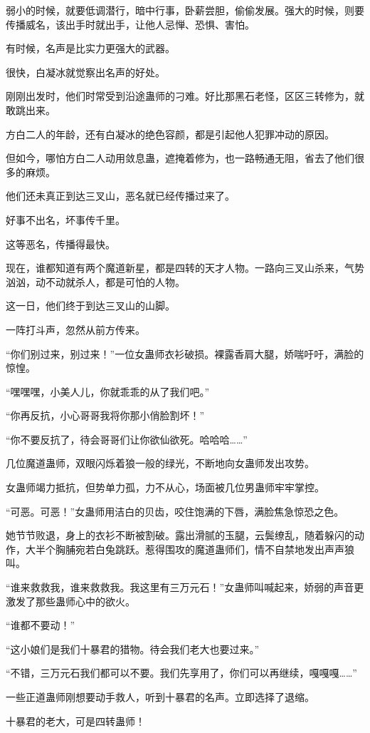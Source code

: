 \begin{this_body}
弱小的时候，就要低调潜行，暗中行事，卧薪尝胆，偷偷发展。强大的时候，则要传播威名，该出手时就出手，让他人忌惮、恐惧、害怕。

有时候，名声是比实力更强大的武器。

很快，白凝冰就觉察出名声的好处。

刚刚出发时，他们时常受到沿途蛊师的刁难。好比那黑石老怪，区区三转修为，就敢跳出来。

方白二人的年龄，还有白凝冰的绝色容颜，都是引起他人犯罪冲动的原因。

但如今，哪怕方白二人动用敛息蛊，遮掩着修为，也一路畅通无阻，省去了他们很多的麻烦。

他们还未真正到达三叉山，恶名就已经传播过来了。

好事不出名，坏事传千里。

这等恶名，传播得最快。

现在，谁都知道有两个魔道新星，都是四转的天才人物。一路向三叉山杀来，气势汹汹，动不动就杀人，都是可怕的人物。

这一日，他们终于到达三叉山的山脚。

一阵打斗声，忽然从前方传来。

“你们别过来，别过来！”一位女蛊师衣衫破损。裸露香肩大腿，娇喘吁吁，满脸的惊惶。

“嘿嘿嘿，小美人儿，你就乖乖的从了我们吧。”

“你再反抗，小心哥哥我将你那小俏脸割坏！”

“你不要反抗了，待会哥哥们让你欲仙欲死。哈哈哈……”

几位魔道蛊师，双眼闪烁着狼一般的绿光，不断地向女蛊师发出攻势。

女蛊师竭力抵抗，但势单力孤，力不从心，场面被几位男蛊师牢牢掌控。

“可恶。可恶！”女蛊师用洁白的贝齿，咬住饱满的下唇，满脸焦急惊恐之色。

她节节败退，身上的衣衫不断被割破。露出滑腻的玉腿，云鬓缭乱，随着躲闪的动作，大半个胸脯宛若白兔跳跃。惹得围攻的魔道蛊师们，情不自禁地发出声声狼叫。

“谁来救救我，谁来救救我。我这里有三万元石！”女蛊师叫喊起来，娇弱的声音更激发了那些蛊师心中的欲火。

“谁都不要动！”

“这小娘们是我们十暴君的猎物。待会我们老大也要过来。”

“不错，三万元石我们都可以不要。我们先享用了，你们可以再继续，嘎嘎嘎……”

一些正道蛊师刚想要动手救人，听到十暴君的名声。立即选择了退缩。

十暴君的老大，可是四转蛊师！


\end{this_body}
